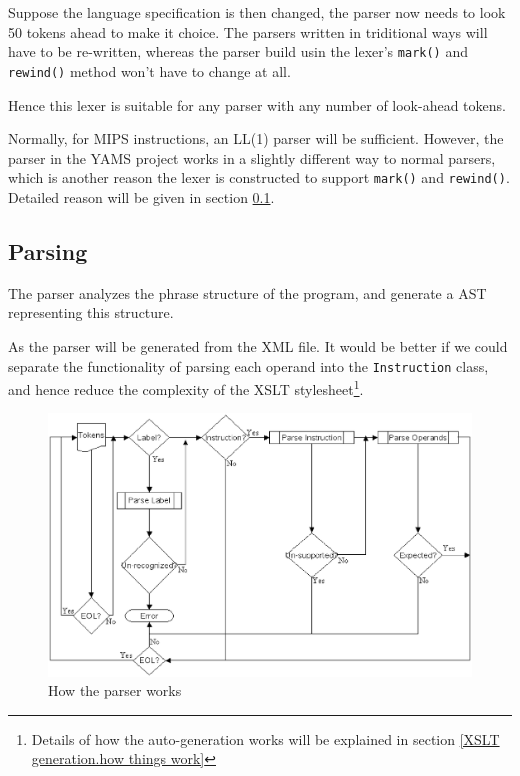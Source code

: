 \begin{itemize}
Suppose the language specification is then changed, the parser now needs to
look 50 tokens ahead to make it choice. The parsers written in triditional
ways will have to be re-written, whereas the parser build usin the lexer's
\texttt{mark()} and \texttt{rewind()} method won't have to change at all.

Hence this lexer is suitable for any parser with any number of look-ahead 
tokens.

Normally, for MIPS instructions, an LL(1) parser will be
sufficient. However, the parser in the YAMS project works in a
slightly different way to normal parsers, which is another reason the
lexer is constructed to support \texttt{mark()} and
\texttt{rewind()}. Detailed reason will be given in section
\ref{parsing}.

\end{itemize}

\subsection{Parsing} \label{parsing}

The parser analyzes the phrase structure of the program, and
generate a AST representing this structure.

As the parser will be generated from the XML file. It would be
better if we could separate the functionality of parsing each
operand into the \texttt{Instruction} class, and hence reduce the
complexity of the XSLT stylesheet\footnote{Details of how the
auto-generation works will be explained in section \ref{XSLT
generation.how things work}}.

\begin{figure}[h]

\begin{center}
\includegraphics[scale=0.5]{parserflow.eps}
\end{center}

\caption{How the parser works} \label{figure.how parser works}

\end{figure}

